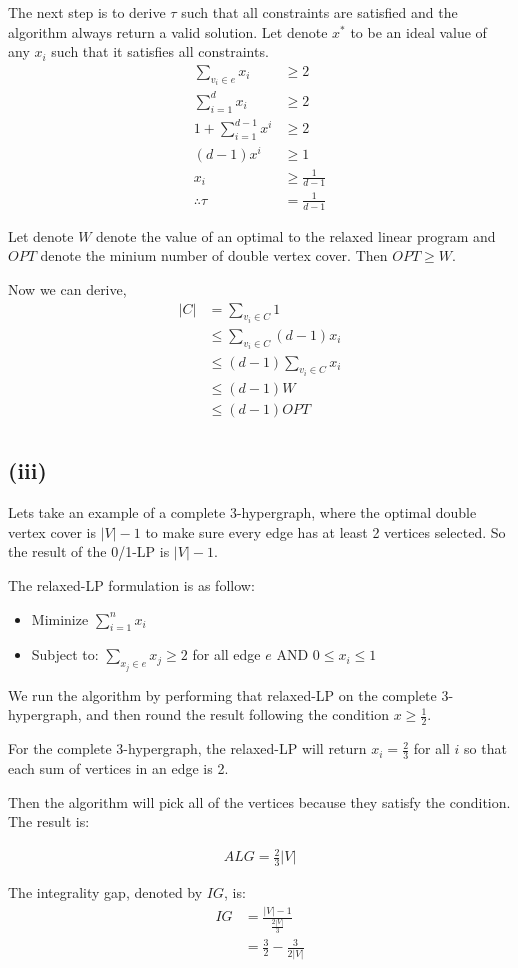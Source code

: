 The next step is to derive $\tau$ such that all constraints are satisfied and the algorithm always return a valid solution. Let denote
$x^*$ to be an ideal value of any $x_i$ such that it satisfies all constraints.
\begin{align*}
\sum\limits_{v_{i} \in e} x_i &\geq 2 \\
\sum\limits_{i=1}^d x_i &\geq 2 \\
1 + \sum\limits_{i=1}^{d-1} x^i &\geq 2 \\
(d-1) x^i &\geq 1 \\
x_i &\geq \frac{1}{d-1} \\
\therefore \tau &= \frac{1}{d-1}
\end{align*}

Let denote $W$ denote the value of an optimal to the relaxed linear program and $OPT$ denote the minium number of double vertex cover.
Then $OPT \geq W$.

Now we can derive,
\begin{align*}
    |C| &= \sum\limits_{v_i \in C} 1 \\
        &\leq \sum\limits_{v_i \in C} (d-1)x_i \\
        &\leq (d-1) \sum\limits_{v_i \in C} x_i \\
        &\leq (d-1)W \\
        &\leq (d-1)OPT \\
\end{align*}

\subsection*{(iii)}
Lets take an example of a complete 3-hypergraph, where the optimal double vertex cover is $|V| - 1$ to make sure every edge has at least 2 vertices selected. So the result of the 0/1-LP is $|V| - 1$.

The relaxed-LP formulation is as follow:

\begin{itemize}
  \item Miminize $\sum_{i=1}^{n} x_i$
  
  \item Subject to:
    $\sum_{x_j \in e} x_j \geq 2$ for all edge $e$
    AND $0 \leq x_i \leq 1$
\end{itemize}

We run the algorithm by performing that relaxed-LP on the complete 3-hypergraph, and then round the result following the condition $x \geq \frac{1}{2}$.

For the complete 3-hypergraph, the relaxed-LP will return $x_i = \frac{2}{3}$ for all $i$ so that each sum of vertices in an edge is 2.

Then the algorithm will pick all of the vertices because they satisfy the condition. The result is:

\begin{align*}
  ALG = \frac{2}{3}|V|
\end{align*}

The integrality gap, denoted by $IG$, is:
\begin{align*}
  IG &= \frac{|V| - 1}{\frac{2|V|}{3}} \\
  &= \frac{3}{2} - \frac{3}{2|V|}
\end{align*}
